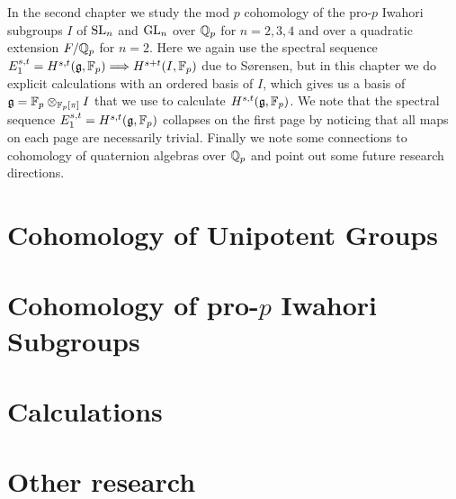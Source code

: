 \documentclass[letterpaper,oneside,english,11pt,openany]{memoir}
\begin{document}
In the second chapter we study the mod $p$ cohomology of the pro-$p$ Iwahori subgroups $I$ of $\operatorname{SL}_{n}$ and $\operatorname{GL}_{n}$ over $\mathbb{Q}_{p}$ for $n=2,3,4$ and over a quadratic extension $F/\mathbb{Q}_{p}$ for $n=2$. Here we again use the spectral sequence $E_{1}^{s,t} = H^{s,t}(\mathfrak{g},\mathbb{F}_{p}) \Longrightarrow H^{s+t}(I,\mathbb{F}_{p})$ due to Sørensen, but in this chapter we do explicit calculations with an ordered basis of $I$, which gives us a basis of $\mathfrak{g} = \mathbb{F}_{p} \otimes_{\mathbb{F}_{p}[\pi]} I$ that we use to calculate $H^{s,t}(\mathfrak{g},\mathbb{F}_{p})$. We note that the spectral sequence $E_{1}^{s,t} = H^{s,t}(\mathfrak{g},\mathbb{F}_{p})$ collapses on the first page by noticing that all maps on each page are necessarily trivial. Finally we note some connections to cohomology of quaternion algebras over $\mathbb{Q}_{p}$ and point out some future research directions.

\clearpage

\mainmatter

\pagestyle{ruled}



\chapter{Cohomology of Unipotent Groups}%
\label{cha:cohunigps}



\chapter{Cohomology of pro-\texorpdfstring{$p$}{p} Iwahori Subgroups}%
\label{cha:cohiwagps}



\clearpage

\appendix

\chapter{Calculations}



\chapter{Other research}%
\label{cha:robstat}



\clearpage

\backmatter

\pagestyle{plain}

\printbibliography

\clearpage

\printindex
\end{document}
